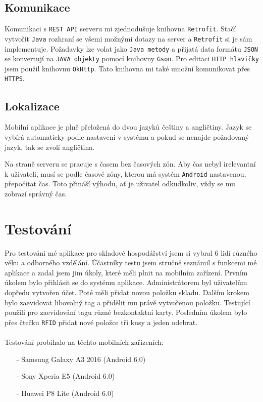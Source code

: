 \documentclass[czech,BP]{thesiskiv}
\begin{document}
\newpage	

\section{Komunikace}
	Komunikaci s \texttt{REST API} serveru mi zjednodušuje knihovna \texttt{Retrofit}.
	Stačí vytvořit \texttt{Java} rozhraní se všemi možnými dotazy na server a \texttt{Retrofit} si je sám implementuje.
	Požadavky lze volat jako \texttt{Java metody} a přijatá data formátu \texttt{JSON} se konvertují na \texttt{JAVA objekty} pomocí knihovny \texttt{Gson}. 
	Pro editaci \texttt{HTTP hlavičky} jsem použil knihovnu \texttt{OkHttp}. Tato knihovna mi také umožní komunikovat přes \texttt{HTTPS}. 


\section{Lokalizace}
Mobilní aplikace je plně přeložená do dvou jazyků češtiny a angličtiny.
Jazyk se vybírá automaticky podle nastavení v systému a pokud se nenajde požadovaný jazyk, tak se zvolí angličtina. 

Na straně serveru se pracuje s časem bez časových zón.
Aby čas nebyl irelevantní k uživateli, musí se podle časové zóny, kterou má systém \texttt{Android} nastavenou, přepočítat čas.
Toto přináší výhodu, ať je uživatel odkudkoliv, vždy se mu zobrazí správný čas.


\chapter{Testování}	
Pro testování mé aplikace pro skladové hospodářství jsem si vybral 6 lidí různého věku a odborného vzdělání. Účastníky testu jsem 
stručně seznámil s funkcemi mé aplikace a zadal jsem jim úkoly, které měli plnit na mobilním zařízení. 
Prvním úkolem bylo přihlásit se do systému aplikace. Administrátorem byl uživatelům dopředu vytvořen účet. Poté měli přidat novou položku skladu. 
Dalším krokem bylo zaevidovat libovolný tag a přidělit mu právě vytvořenou položku. 
Testující použili pro zaevidování tagu různé bezkontaktní karty.  
Posledním úkolem bylo přes čtečku \texttt{RFID} přidat nové položce tři kusy a jeden odebrat.
\\\\
Testování probíhalo na těchto mobilních zařízeních:
\begin{itemize}[noitemsep]
	\item [-] Samsung Galaxy A3 2016 (Android 6.0)
	\item [-] Sony Xperia E5 (Android 6.0)
	\item [-] Huawei P8 Lite (Android 6.0)
\end{itemize}
\end{document}
